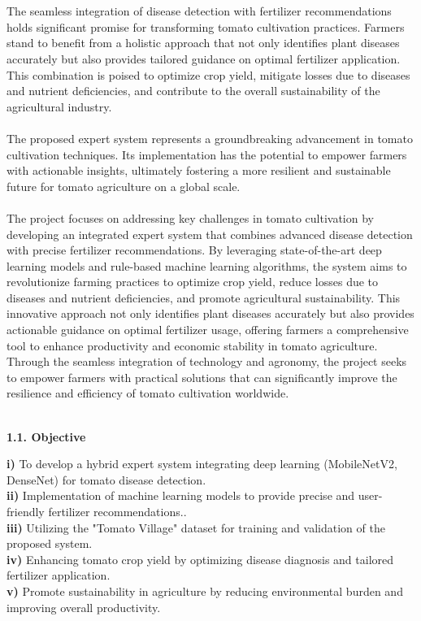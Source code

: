 \documentclass[12pt, English]{article}
\newcommand\tab[1][1cm]{\hspace*{#1}}
\begin{document}
\begin{normalsize}
\\\\
\tab  
The seamless integration of disease detection with fertilizer recommendations holds significant promise for transforming tomato cultivation practices. Farmers stand to benefit from a holistic approach that not only identifies plant diseases accurately but also provides tailored guidance on optimal fertilizer application. This combination is poised to optimize crop yield, mitigate losses due to diseases and nutrient deficiencies, and contribute to the overall sustainability of the agricultural industry.
\\\\
\tab
The proposed expert system represents a groundbreaking advancement in tomato cultivation techniques. Its implementation has the potential to empower farmers with actionable insights, ultimately fostering a more resilient and sustainable future for tomato agriculture on a global scale.
\\\\
\tab
The project focuses on addressing key challenges in tomato cultivation by developing an integrated expert system that combines advanced disease detection with precise fertilizer recommendations. By leveraging state-of-the-art deep learning models and rule-based machine learning algorithms, the system aims to revolutionize farming practices to optimize crop yield, reduce losses due to diseases and nutrient deficiencies, and promote agricultural sustainability. This innovative approach not only identifies plant diseases accurately but also provides actionable guidance on optimal fertilizer usage, offering farmers a comprehensive tool to enhance productivity and economic stability in tomato agriculture. Through the seamless integration of technology and agronomy, the project seeks to empower farmers with practical solutions that can significantly improve the resilience and efficiency of tomato cultivation worldwide.
\\\\

\begin{large}
\textbf{1.1. Objective}
\end{large}
\begin{enumerate}
    \textbf{i)} To develop a hybrid expert system integrating deep learning (MobileNetV2, DenseNet) for tomato disease detection.\\
    \textbf{ii)} Implementation of machine learning models to provide precise and user-friendly fertilizer recommendations.. \\
    \textbf{iii)} Utilizing the "Tomato Village" dataset for training and validation of the proposed system.\\
    \textbf{iv)} Enhancing tomato crop yield by optimizing disease diagnosis and tailored fertilizer application.  \\
    \textbf{v)} Promote sustainability in agriculture by reducing environmental burden and improving overall productivity.


\end{enumerate}
\end{normalsize}
\end{document}
